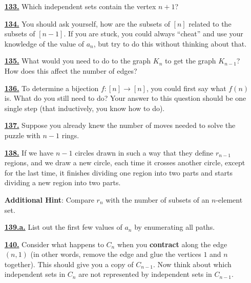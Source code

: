 \documentclass[10pt,]{book}
\newcommand{\terminology}[1]{\textbf{#1}}
\theoremstyle{plain}
\theoremstyle{definition}
\theoremstyle{definition}
\theoremstyle{definition}
\numberwithin{equation}{chapter}
\begin{document}
\begin{itemize}[itemsep=1em]
\hypertarget{a-133}{}\item[\textbf{\hyperref[activity-126]{133.}}]
\hypertarget{p-889}{}%
Which independent sets contain the vertex \(n+1\)?%

\hypertarget{a-134}{}\item[\textbf{\hyperref[activity-127]{134.}}]
\hypertarget{p-893}{}%
You should ask yourself, how are the subsets of \([n]\) related to the subsets of \([n-1]\).  If you are stuck, you could always ``cheat'' and use your knowledge of the value of \(a_n\), but try to do this without thinking about that.%

\hypertarget{a-135}{}\item[\textbf{\hyperref[activity-128]{135.}}]
\hypertarget{p-895}{}%
What would you need to do to the graph \(K_n\) to get the graph \(K_{n-1}\)?  How does this affect the number of edges?%

\hypertarget{a-136}{}\item[\textbf{\hyperref[activity-129]{136.}}]
\hypertarget{p-897}{}%
To determine a bijection \(f:[n] \to [n]\), you could first say what \(f(n)\) is.  What do you still need to do?  Your answer to this question should be one single step (that inductively, you know how to do).%

\hypertarget{a-137}{}\item[\textbf{\hyperref[HanoiProblem]{137.}}]
\hypertarget{p-899}{}%
Suppose you already knew the number of moves needed to solve the puzzle with \(n-1\) rings.%

\hypertarget{a-138}{}\item[\textbf{\hyperref[circlesinplane]{138.}}]
\hypertarget{p-902}{}%
If we have \(n - 1\) circles drawn in such a way that they define \(r_{n-1}\) regions, and we draw a new circle, each time it crosses another circle, except for the last time, it finishes dividing one region into two parts and starts dividing a new region into two parts.%

\par\smallskip
\noindent\textbf{Additional Hint}: \hypertarget{p-903}{}%
Compare \(r_n\) with the number of subsets of an \(n\)-element set.%

\hypertarget{a-139.a}{}\item[\textbf{\hyperref[task-171]{139.a.}}]
\hypertarget{p-909}{}%
List out the first few values of \(a_n\) by enumerating all paths.%

\hypertarget{a-140}{}\item[\textbf{\hyperref[activity-133]{140.}}]
\hypertarget{p-912}{}%
Consider what happens to \(C_n\) when you \terminology{contract} along the edge \((n,1)\) (in other words, remove the edge and glue the vertices \(1\) and \(n\) together).  This should give you a copy of \(C_{n-1}\).  Now think about which independent sets in \(C_n\) are not represented by independent sets in \(C_{n-1}\).%


\end{itemize}
\end{document}
